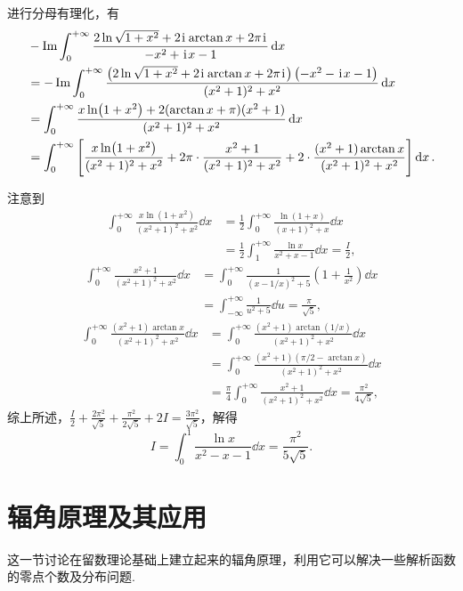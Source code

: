 \begin{example}
\begin{solution}
进行分母有理化，有\begin{align*}
&-\Im \int_0^{+\infty} \frac{2\ln\sqrt{1+x^2} + 2\kern1pt\mathrm{i}\kern1pt \arctan x + 2\pi\kern1pt\mathrm{i}\kern1pt}{-x^2+\kern1pt\mathrm{i}\kern1pt x-1} \dd{x} \\
&= -\Im \int_0^{+\infty} \frac{\left(2\ln\sqrt{1+x^2} + 2\kern1pt\mathrm{i}\kern1pt \arctan x + 2\pi\kern1pt\mathrm{i}\kern1pt\right) \left(-x^2-\kern1pt\mathrm{i}\kern1pt x-1\right)}{(x^2+1)^2+x^2} \dd{x} \\
&= \int_0^{+\infty} \frac{x \ln(1+x^2) + 2(\arctan x + \pi) (x^2+1)}{(x^2+1)^2+x^2} \dd{x} \\
&= \int_0^{+\infty} \left[
\frac{x \ln(1+x^2)}{(x^2+1)^2+x^2}
+ 2\pi \cdot \frac{x^2+1}{(x^2+1)^2+x^2}
+ 2 \cdot \frac{(x^2+1) \arctan x}{(x^2+1)^2+x^2}
\right] \dd{x}.
\end{align*}

注意到\begin{align*}
\int_0^{+\infty} \frac{x \ln(1+x^2)}{(x^2+1)^2+x^2} \dd{x}
&= \frac{1}{2} \int_0^{+\infty} \frac{\ln(1+x)}{(x+1)^2+x} \dd{x} \\
&= \frac{1}{2} \int_1^{+\infty} \frac{\ln x}{x^2+x-1} \dd{x}
= \frac{I}{2},
\end{align*}
\begin{align*}
\int_0^{+\infty} \frac{x^2+1}{(x^2+1)^2+x^2} \dd{x}
&= \int_0^{+\infty} \frac{1}{\left(x-1/x\right)^2+5} \left(1+\frac{1}{x^2}\right) \dd{x} \\
&= \int_{-\infty}^{+\infty} \frac{1}{u^2+5} \dd{u}
= \frac{\pi}{\sqrt{5}},
\end{align*}
\begin{align*}
\int_0^{+\infty} \frac{(x^2+1) \arctan x}{(x^2+1)^2+x^2} \dd{x}
&= \int_0^{+\infty} \frac{(x^2+1) \arctan(1/x)}{(x^2+1)^2+x^2} \dd{x} \\
&= \int_0^{+\infty} \frac{(x^2+1) (\pi/2 - \arctan x)}{(x^2+1)^2+x^2} \dd{x} \\
&= \frac{\pi}{4} \int_0^{+\infty} \frac{x^2+1}{(x^2+1)^2+x^2} \dd{x}
= \frac{\pi^2}{4\sqrt{5}},
\end{align*}
综上所述，\(\frac{I}{2} + \frac{2\pi^2}{\sqrt{5}} + \frac{\pi^2}{2\sqrt{5}} + 2I = \frac{3\pi^2}{\sqrt{5}}\)，解得\[
I = \int_0^1 \frac{\ln x}{x^2-x-1} \dd{x}
= \frac{\pi^2}{5\sqrt{5}}.
\]
\end{solution}
\end{example}

\section{辐角原理及其应用}
这一节讨论在留数理论基础上建立起来的辐角原理，利用它可以解决一些解析函数的零点个数及分布问题.

